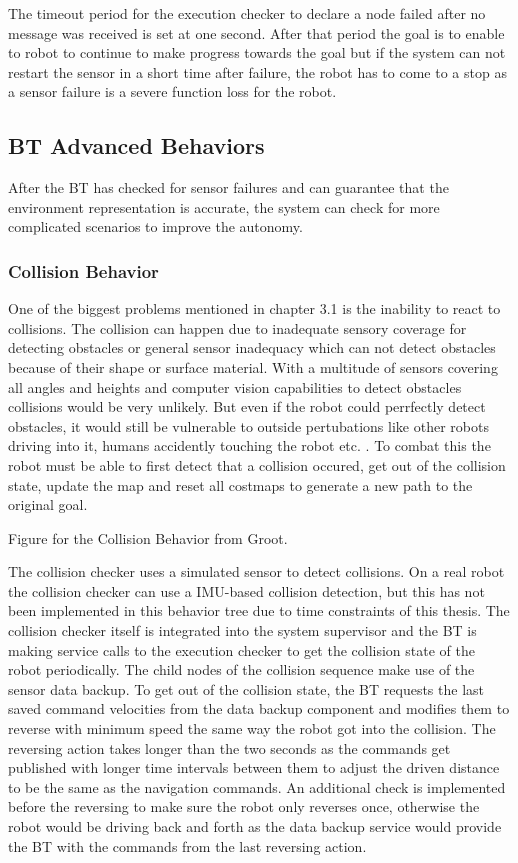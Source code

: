 The timeout period for the execution checker to declare a node failed after no message was received is set at one second. 
After that period the goal is to enable to robot to continue to make progress towards the goal but if the system can not restart the sensor in a short time after failure, the robot has to come to a stop as a sensor failure is a severe function loss for the robot.


\subsection{BT Advanced Behaviors}
After the BT has checked for sensor failures and can guarantee that the environment representation is accurate, the system can check for more complicated scenarios to improve the autonomy. 


\subsubsection{Collision Behavior}
One of the biggest problems mentioned in chapter 3.1 is the inability to react to collisions. The collision can happen due to inadequate sensory coverage for detecting obstacles or general sensor inadequacy which can not detect obstacles because of their shape or surface material. With a multitude of sensors covering all angles and heights and computer vision capabilities to detect obstacles collisions would be very unlikely. But even if the robot could perrfectly detect obstacles, it would still be vulnerable to outside pertubations like other robots driving into it, humans accidently touching the robot etc. . 
To combat this the robot must be able to first detect that a collision occured, get out of the collision state, update the map and reset all costmaps to generate a new path to the original goal. 

Figure for the Collision Behavior from Groot.

The collision checker uses a simulated sensor to detect collisions. On a real robot the collision checker can use a IMU-based collision detection, but this has not been implemented in this behavior tree due to time constraints of this thesis. The collision checker itself is integrated into the system supervisor and the BT is making service calls to the execution checker to get the collision state of the robot periodically. 
The child nodes of the collision sequence make use of the sensor data backup. 
To get out of the collision state, the BT requests the last saved command velocities from the data backup component and modifies them to reverse with minimum speed the same way the robot got into the collision. The reversing action takes longer than the two seconds as the commands get published with longer time intervals between them to adjust the driven distance to be the same as the navigation commands. An additional check is implemented before the reversing to make sure the robot only reverses once, otherwise the robot would be driving back and forth as the data backup service would provide the BT with the commands from the last reversing action. 

